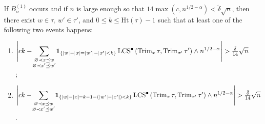 \documentclass[11pt,reqno]{amsart}
\newcommand{\Ht}{\mathrm{Ht}}
\newcommand{\Trim}{\operatorname{Trim}}
\newcommand{\LCS}{\operatorname{LCS}}
\begin{document}
\begin{lem}
\label{deter_lemma:no_sausages}
If $B_n^{(1)}$ occurs and if $n$ is large enough so that $14\max(c,n^{1/2-\alpha})<\tilde{\delta}\sqrt{n}$, then there exist $w \in \tau$,  $w'\in \tau'$, and $0\leq k\leq \Ht(\tau)-1$ such that at least one of the following two events happens:
\begin{enumerate}
\item[\emph{(i)}] $\displaystyle{\Bigg|ck- \!\sum_{\substack{\varnothing \prec x\preceq w \\ \varnothing \prec x'\preceq w'}}\! \I{|w|-|x|=|w'|-|x'|<k} \LCS^\bullet\left(\Trim_{x}\tau,\Trim_{x'}\tau'\right)\wedge n^{1/2-\alpha}\Bigg|>\tfrac{\tilde\delta}{14} \sqrt{n} }$;
\item[\emph{(ii)}] $\displaystyle{\Bigg|ck- \!\sum_{\substack{\varnothing \prec x\preceq w \\ \varnothing \prec x'\preceq w'}}\! \I{|w|-|x|=k-1-(|w'|-|x'|)<k} \LCS^\bullet\left(\Trim_{x}\tau,\Trim_{x'}\tau'\right)\wedge n^{1/2-\alpha}\Bigg|>\tfrac{\tilde\delta}{14} \sqrt{n} }$.
\end{enumerate}
\end{lem}
\end{document}
